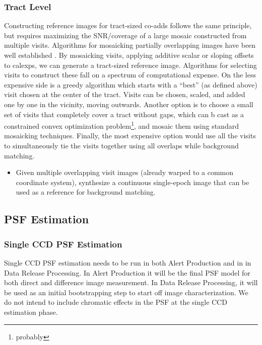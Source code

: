 \subsubsection{Tract Level}
Constructing reference images for tract-sized co-adds follows the same principle, but requires maximizing the
SNR/coverage of a large mosaic constructed from multiple visits.  Algorithms for mosaicking partially
overlapping images have been well established \citep[e.g.][]{Sick2013, Berriman2008}. By mosaicking visits,
applying additive scalar or sloping offsets to calexps, we can generate a tract-sized reference image.
Algorithms for selecting visits to construct these fall on a spectrum of computational expense. On the less
expensive side is a greedy algorithm which starts with a ``best'' (as defined above) visit chosen at the
center of the tract.  Visits can be chosen, scaled, and added one by one in the vicinity, moving outwards.
Another option is to choose a small set of visits that completely cover a tract without gaps, which can b
cast as a constrained convex optimization problem\footnote{probably}, and mosaic them using standard
mosaicking techniques.  Finally, the most expensive option would use all the visits to simultaneously tie the
visits together using all overlaps while background matching.

\begin{itemize}
\item Given multiple overlapping visit images (already warped to a common coordinate system), synthesize a continuous single-epoch image that can be used as a reference for background matching.
\end{itemize}

\subsection{PSF Estimation}
\label{sec:acPSFEstimation}

\subsubsection{Single CCD PSF Estimation}
\label{sec:acSingleCCDPSF}

Single CCD PSF estimation needs to be run in both Alert Production and in in Data Release Processing.  In Alert Production it will be the final PSF model for both direct and difference image measurement.  In Data Release Processing, it will be used as an initial bootstrapping step to start off image characterization.  We do not intend to include chromatic effects in the PSF at the single CCD estimation phase.

